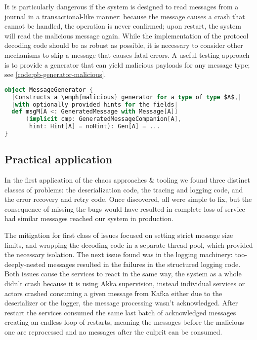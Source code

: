 It is particularly dangerous if the system is designed to read messages from a journal in a transactional-like manner: because the message causes a crash that cannot be handled, the  operation is never confirmed; upon restart, the system will read the malicious message again. While the implementation of the protocol decoding code should be as robust as possible, it is necessary to consider other mechanisms to skip a message that causes fatal errors. A useful testing approach is to provide a generator that can yield malicious payloads for any message type; see \autoref{code:pb-generator-malicious}.

\begin{lstlisting}[caption={Malicious Generator}, label={code:pb-generator-malicious}, language=Scala, escapechar=|]
object MessageGenerator {
  |Constructs a \emph{malicious} generator for a type of type $A$,|
  |with optionally provided hints for the fields|
  def msgM[A <: GeneratedMessage with Message[A]]
      (implicit cmp: GeneratedMessageCompanion[A], 
       hint: Hint[A] = noHint): Gen[A] = ...
}
\end{lstlisting}

\subsection{Practical application}
In the first application of the chaos approaches \& tooling we found three distinct classes of problems: the deserialization code, the tracing and logging code, and the error recovery and retry code. Once discovered, all were simple to fix, but the consequence of missing the bugs would have resulted in complete loss of service had similar messages reached our system in production.

The mitigation for first class of issues focused on setting strict message size limits, and wrapping the decoding code in a separate thread pool, which provided the necessary isolation. The next issue found was in the logging machinery: too-deeply-nested messages resulted in the failures in the structured logging code. Both issues cause the services to react in the same way, the system as a whole didn't crash because it is using Akka supervision, instead individual services or actors crashed consuming a given message from Kafka either due to the deserializer or the logger, the message processing wasn't acknowledged. After restart the services consumed the same last batch of acknowledged messages creating an endless loop of restarts, meaning the messages before the malicious one are reprocessed and no messages after the culprit can be consumed. 

\printbibliography


